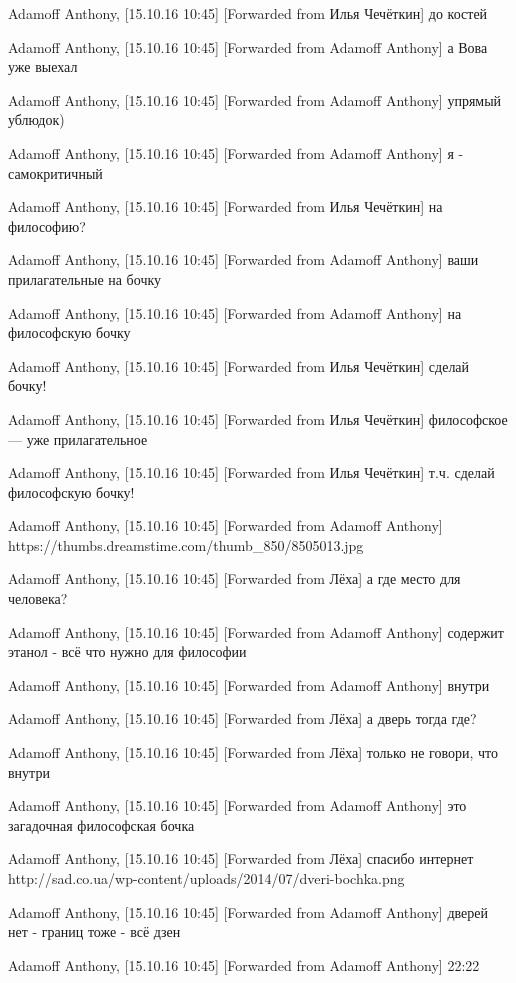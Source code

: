 Adamoff Anthony, [15.10.16 10:45]
[Forwarded from Илья Чечёткин]
до костей

Adamoff Anthony, [15.10.16 10:45]
[Forwarded from Adamoff Anthony]
а Вова уже выехал

Adamoff Anthony, [15.10.16 10:45]
[Forwarded from Adamoff Anthony]
упрямый ублюдок)

Adamoff Anthony, [15.10.16 10:45]
[Forwarded from Adamoff Anthony]
я - самокритичный

Adamoff Anthony, [15.10.16 10:45]
[Forwarded from Илья Чечёткин]
на философию?

Adamoff Anthony, [15.10.16 10:45]
[Forwarded from Adamoff Anthony]
ваши прилагательные на бочку

Adamoff Anthony, [15.10.16 10:45]
[Forwarded from Adamoff Anthony]
на философскую бочку

Adamoff Anthony, [15.10.16 10:45]
[Forwarded from Илья Чечёткин]
сделай бочку!

Adamoff Anthony, [15.10.16 10:45]
[Forwarded from Илья Чечёткин]
философское — уже прилагательное

Adamoff Anthony, [15.10.16 10:45]
[Forwarded from Илья Чечёткин]
т.ч. сделай философскую бочку!

Adamoff Anthony, [15.10.16 10:45]
[Forwarded from Adamoff Anthony]
https://thumbs.dreamstime.com/thumb_850/8505013.jpg

Adamoff Anthony, [15.10.16 10:45]
[Forwarded from Лёха]
а где место для человека?

Adamoff Anthony, [15.10.16 10:45]
[Forwarded from Adamoff Anthony]
содержит этанол - всё что нужно для философии

Adamoff Anthony, [15.10.16 10:45]
[Forwarded from Adamoff Anthony]
внутри

Adamoff Anthony, [15.10.16 10:45]
[Forwarded from Лёха]
а дверь тогда где?

Adamoff Anthony, [15.10.16 10:45]
[Forwarded from Лёха]
только не говори, что внутри

Adamoff Anthony, [15.10.16 10:45]
[Forwarded from Adamoff Anthony]
это загадочная философская бочка

Adamoff Anthony, [15.10.16 10:45]
[Forwarded from Лёха]
спасибо интернет
http://sad.co.ua/wp-content/uploads/2014/07/dveri-bochka.png

Adamoff Anthony, [15.10.16 10:45]
[Forwarded from Adamoff Anthony]
дверей нет - границ тоже - всё дзен

Adamoff Anthony, [15.10.16 10:45]
[Forwarded from Adamoff Anthony]
22:22

